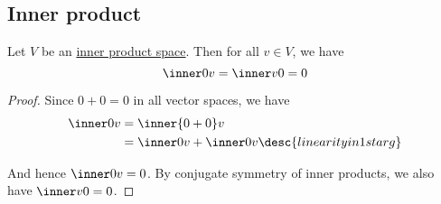 \subsection{Inner product}\label{a79966a}

\label{f9096e1}

Let $V$ be an \href{b9935c8}{inner product space}. Then for all $v\in V$, we
have
$$
  \inner0v=\inner v0=0
$$

\begin{proof}
  Since $0+0=0$ in all vector spaces, we have
  \begin{align*}
    \inner0v &=\inner{0+0}v                                 \\
             &=\inner0v+\inner0v\desc{linearity in 1st arg}
  \end{align*}

  And hence $\inner 0v=0$. By conjugate symmetry of inner products, we also
  have $\inner v0=0$.
\end{proof}
